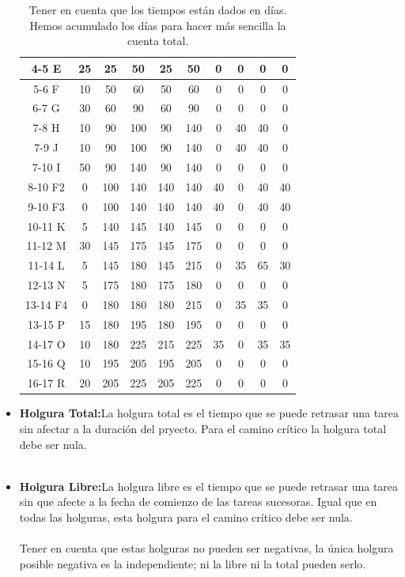 \documentclass[11pt,letterpaper,onecolumn]{article}
\begin{document}
\begin{itemize}
\begin{table}[htbp]
\begin{tabular}{|c|ccccccccc|}
        4-5 E & 25 & 25 & 50 & 25 & 50 & 0 & 0 & 0 & 0 \\ \hline
        5-6 F & 10 & 50 & 60 & 50 & 60 & 0 & 0 & 0 & 0 \\ \hline
        6-7 G & 30 & 60 & 90 & 60 & 90 & 0 & 0 & 0 & 0 \\ \hline
        7-8 H & 10 & 90 & 100 & 90 & 140 & 0 & 40 & 40 & 0 \\ \hline
        7-9 J & 10 & 90 & 100 & 90 & 140 & 0 & 40 & 40 & 0 \\ \hline
        7-10 I & 50 & 90 & 140 & 90 & 140 & 0 & 0 & 0 & 0 \\ \hline
        8-10 F2 & 0 & 100 & 140 & 140 & 140 & 40 & 0 & 40 & 40 \\ \hline
        9-10 F3 & 0 & 100 & 140 & 140 & 140 & 40 & 0 & 40 & 40 \\ \hline
        10-11 K & 5 & 140 & 145 & 140 & 145 & 0 & 0 & 0 & 0 \\ \hline
        11-12 M & 30 & 145 & 175 & 145 & 175 & 0 & 0 & 0 & 0 \\ \hline
        11-14 L & 5 & 145 & 180 & 145 & 215 & 0 & 35 & 65 & 30 \\ \hline
        12-13 N & 5 & 175 & 180 & 175 & 180 & 0 & 0 & 0 & 0 \\ \hline
        13-14 F4 & 0 & 180 & 180 & 180 & 215 & 0 & 35 & 35 & 0 \\ \hline
        13-15 P & 15 & 180 & 195 & 180 & 195 & 0 & 0 & 0 & 0 \\ \hline
        14-17 O & 10 & 180 & 225 & 215 & 225 & 35 & 0 & 35 & 35 \\ \hline
        15-16 Q & 10 & 195 & 205 & 195 & 205 & 0 & 0 & 0 & 0 \\ \hline
        16-17 R & 20 & 205 & 225 & 205 & 225 & 0 & 0 & 0 & 0 \\ \hline
    \end{tabular}
    \label{}
    \captionsetup{justification=centering}
    \caption{Tener en cuenta que los tiempos están dados en días. Hemos acumulado los días para hacer más sencilla la cuenta total. }    
\end{table}

\item{\textbf{Holgura Total:}}La holgura total es el tiempo que se puede retrasar una tarea sin afectar a la duración del pryecto. Para el camino crítico la holgura total debe ser nula. \\
\\
\item{\textbf{Holgura Libre:}}La holgura libre es el tiempo que se puede retrasar una tarea sin que afecte a la fecha de comienzo de las tareas sucesoras. Igual que en todas las holguras, esta holgura para el camino crítico debe ser nula.\\
\\
Tener en cuenta que estas holguras no pueden ser negativas, la única holgura posible negativa es la independiente; ni la libre ni la total pueden serlo. \\
\\


\end{itemize}
\end{document}
